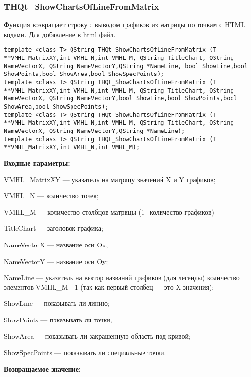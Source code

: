 \documentclass[a4paper,12pt]{article}
\begin{document}
\subsubsection{THQt\_ShowChartsOfLineFromMatrix}\label{THQt_ShowChartsOfLineFromMatrix}

Функция возвращает строку с выводом графиков из матрицы по точкам с HTML кодами. Для добавление в html файл.


\begin{lstlisting}[label=code_syntax_THQt_ShowChartsOfLineFromMatrix,caption=Синтаксис]
template <class T> QString THQt_ShowChartsOfLineFromMatrix (T **VMHL_MatrixXY,int VMHL_N,int VMHL_M, QString TitleChart, QString NameVectorX, QString NameVectorY,QString *NameLine, bool ShowLine,bool ShowPoints,bool ShowArea,bool ShowSpecPoints);
template <class T> QString THQt_ShowChartsOfLineFromMatrix (T **VMHL_MatrixXY,int VMHL_N,int VMHL_M, QString TitleChart, QString NameVectorX, QString NameVectorY,bool ShowLine,bool ShowPoints,bool ShowArea,bool ShowSpecPoints);
template <class T> QString THQt_ShowChartsOfLineFromMatrix (T **VMHL_MatrixXY,int VMHL_N,int VMHL_M, QString TitleChart, QString NameVectorX, QString NameVectorY,QString *NameLine);
template <class T> QString THQt_ShowChartsOfLineFromMatrix (T **VMHL_MatrixXY,int VMHL_N,int VMHL_M);
\end{lstlisting}

\textbf{Входные параметры:}
 
    VMHL\_MatrixXY --- указатель на матрицу значений X и Y графиков;
 
    VMHL\_N --- количество точек;
 
    VMHL\_M --- количество столбцов матрицы (1+количество графиков);
 
    TitleChart --- заголовок графика;
 
    NameVectorX --- название оси Ox;
 
    NameVectorY --- название оси Oy;
 
    NameLine --- указатель на вектор названий графиков (для легенды) количество элементов VMHL\_M---1 (так как первый столбец --- это X значения);
 
    ShowLine --- показывать ли линию;
 
    ShowPoints --- показывать ли точки;
 
    ShowArea --- показывать ли закрашенную область под кривой;
 
    ShowSpecPoints --- показывать ли специальные точки.

\textbf{Возвращаемое значение:}
\end{document}
